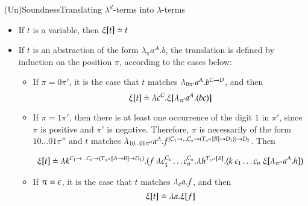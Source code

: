 \documentclass[9pt]{beamer}
\begin{document}
\begin{frame}{(Un)Soundness}{Translating $\lambda^d$-terms into $\lambda$-terms}

\begin{itemize}
\item If $t$ is a variable, then $\xi[t] \doteq t$
%
\item If $t$ is an abstraction of the form $\lambda_{\pi} a^A. b$, the translation is defined by induction on the position $\pi$, according to the cases below:
	\begin{itemize}
	\item If $\pi = 0\pi'$, it is the case that $t$ matches $\lambda_{0\pi'} a^A. b^{C \rightarrow D}$, and then
	$$\xi[t] \doteq \lambda c^C. \xi[\lambda_{\pi'} a^A. (b c)]$$
	\item If $\pi = 1\pi'$, then there is at least one occurrence of the digit $1$ in $\pi'$, since $\pi$ is positive and $\pi'$ is negative. Therefore, $\pi$ is necessarily of the form $10\ldots01\pi''$ and $t$ matches $\lambda_{10\ldots01\pi''} a^A. f^{(C_1 \rightarrow \ldots C_n \rightarrow (T_{\pi''}[B] \rightarrow D_1)) \rightarrow D_2}$. Then
	\begin{scriptsize}
	$$\tP{t} \defEq \lambda k^{C_1 \imp \ldots C_n \imp (T_{\pi''}[A \imp B] \imp D_1)}. (f \ \lambda c_1^{C_1} \ldots c_n^{C_n}. \lambda h^{T_{\pi''}[B]}. (k \ c_1 \ldots c_n \ \tP{\lambda_{\pi''} a^A. h})$$
	\end{scriptsize}
	\item If $\pi = \epsilon$, it is the case that $t$ matches $\lambda_{\epsilon} a. f$, and then
	$$\xi[t] \doteq \lambda a. \xi[f]$$
	\end{itemize}
\end{itemize}

\end{frame}
\end{document}
